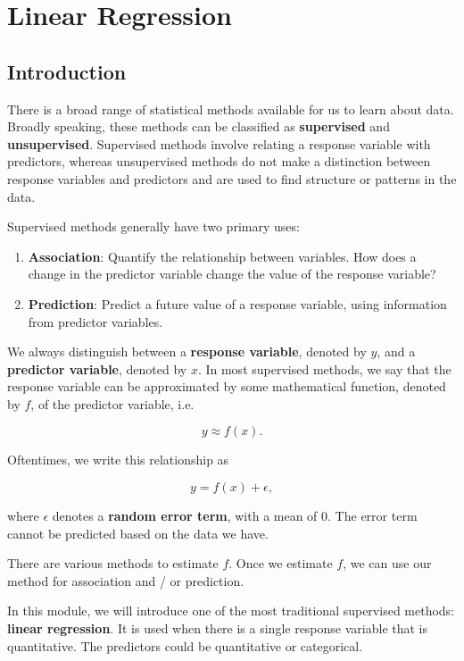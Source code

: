 \documentclass[
]{book}
\providecommand{\tightlist}{%
  \setlength{\itemsep}{0pt}\setlength{\parskip}{0pt}}
\begin{document}
\hypertarget{linear-regression}{%
\chapter{Linear Regression}\label{linear-regression}}

\hypertarget{introduction-6}{%
\section{Introduction}\label{introduction-6}}

There is a broad range of statistical methods available for us to learn about data. Broadly speaking, these methods can be classified as \textbf{supervised} and \textbf{unsupervised}. Supervised methods involve relating a response variable with predictors, whereas unsupervised methods do not make a distinction between response variables and predictors and are used to find structure or patterns in the data.

Supervised methods generally have two primary uses:

\begin{enumerate}
\def\labelenumi{\arabic{enumi}.}
\tightlist
\item
  \textbf{Association}: Quantify the relationship between variables. How does a change in the predictor variable change the value of the response variable?
\item
  \textbf{Prediction}: Predict a future value of a response variable, using information from predictor variables.
\end{enumerate}

We always distinguish between a \textbf{response variable}, denoted by \(y\), and a \textbf{predictor variable}, denoted by \(x\). In most supervised methods, we say that the response variable can be approximated by some mathematical function, denoted by \(f\), of the predictor variable, i.e.

\[
y \approx f(x).
\]

Oftentimes, we write this relationship as

\[
y = f(x) + \epsilon,
\]

where \(\epsilon\) denotes a \textbf{random error term}, with a mean of 0. The error term cannot be predicted based on the data we have.

There are various methods to estimate \(f\). Once we estimate \(f\), we can use our method for association and / or prediction.

In this module, we will introduce one of the most traditional supervised methods: \textbf{linear regression}. It is used when there is a single response variable that is quantitative. The predictors could be quantitative or categorical.
\end{document}
